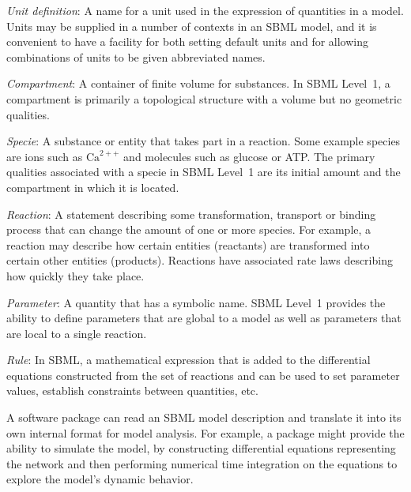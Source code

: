 \documentclass[10pt]{cekarticle}
\begin{document}
\begin{description}
  
\item \emph{Unit definition}: A name for a unit used in the expression of
  quantities in a model.  Units may be supplied in a number of contexts in
  an SBML model, and it is convenient to have a facility for both setting
  default units and for allowing combinations of units to be given
  abbreviated names.

\item \emph{Compartment}: A container of finite volume for substances.  In
  SBML Level~1, a compartment is primarily a topological structure with a
  volume but no geometric qualities.
  
\item \emph{Specie}: A substance or entity that takes part in a reaction.
  Some example species are ions such as $\text{Ca}^{2++}$ and molecules
  such as glucose or ATP.  The primary qualities associated with a specie
  in SBML Level~1 are its initial amount and the compartment in which it is
  located.
  
\item \emph{Reaction}: A statement describing some transformation,
  transport or binding process that can change the amount of one or more
  species.  For example, a reaction may describe how certain entities
  (reactants) are transformed into certain other entities (products).
  Reactions have associated rate laws describing how quickly they take
  place.
  
\item \emph{Parameter}: A quantity that has a symbolic name.  SBML Level~1
  provides the ability to define parameters that are global to a model as
  well as parameters that are local to a single reaction.
  
\item \emph{Rule}: In SBML, a mathematical expression that is added
  to the differential equations constructed from the set of reactions and
  can be used to set parameter values, establish constraints between
  quantities, etc.

\end{description}

A software package can read an SBML model description and translate it
into its own internal format for model analysis.  For example, a package
might provide the ability to simulate the model, by constructing
differential equations representing the network and then performing
numerical time integration on the equations to explore the model's dynamic
behavior.  
\end{document}
